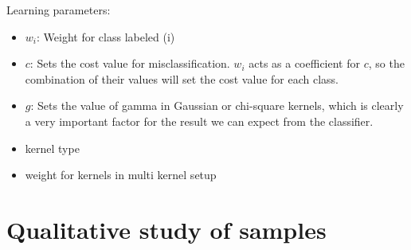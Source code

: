 Learning parameters:
\begin{itemize}
 \item $w_i$: Weight for class labeled (i)
 \item $c$: Sets the cost value for misclassification.
 $w_i$ acts as a coefficient for $c$, so the combination of their values will set the cost value for each class.
 \item $g$: Sets the value of gamma in Gaussian or chi-square kernels, which is clearly a very important factor for the result we can 
expect from the classifier. 
 \item kernel type
 \item weight for kernels in multi kernel setup
\end{itemize}


\section{Qualitative study of samples}
\label{QStudy.ssec}

